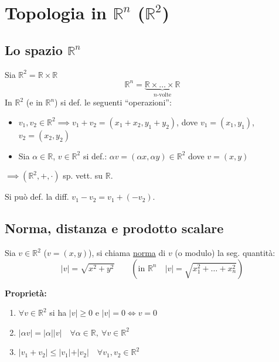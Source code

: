 
\section{Topologia in \texorpdfstring{$\mathbb{R}^n$ ($\mathbb{R}^2$)}{R n (R 2)}}

\subsection{Lo spazio \texorpdfstring{$\mathbb{R}^n$}{R n}}

Sia $\mathbb{R}^2 = \mathbb{R} \times \mathbb{R}$
\[
\mathbb{R}^n = \underbrace{\mathbb{R} \times \dots \times \mathbb{R}}_{n\text{-volte}}
\]
In $\mathbb{R}^2$ (e in $\mathbb{R}^n$) si def. le seguenti ``operazioni'':
\begin{itemize}
    \item[$\oplus$] $v_1, v_2 \in \mathbb{R}^2 \implies v_1 + v_2 = (x_1 + x_2, y_1 + y_2)$, dove $v_1 = (x_1, y_1)$, $v_2 = (x_2, y_2)$
    \item[$\odot$] Sia $\alpha \in \mathbb{R}$, $v \in \mathbb{R}^2$ si def.: $\alpha v = (\alpha x, \alpha y) \in \mathbb{R}^2$ dove $v = (x, y)$
\end{itemize}
$\implies (\mathbb{R}^2, +, \cdot)$ sp. vett. su $\mathbb{R}$.


\begin{oss}
Si può def. la diff. $v_1 - v_2 = v_1 + (-v_2)$.
\end{oss}

\subsection{Norma, distanza e prodotto scalare}

\begin{definition}
Sia $v \in \mathbb{R}^2$ ($v = (x, y)$), si chiama \underline{norma} di $v$ (o modulo) la seg. quantità:
\[
\vert v \vert = \sqrt{x^2 + y^2} \qquad \left(\text{in } \mathbb{R}^n \quad \vert v \vert = \sqrt{x_1^2 + \dots + x_n^2}\right)
\]
\end{definition}

\textbf{Proprietà:}
\begin{enumerate}
    \item $\forall v \in \mathbb{R}^2$ si ha $\vert v \vert \ge 0$ e $\vert v \vert = 0 \iff v = 0$
    \item $\vert \alpha v \vert = \vert \alpha \vert \vert v \vert \quad \forall \alpha \in \mathbb{R}, \ \forall v \in \mathbb{R}^2$
    \item $\vert v_1 + v_2 \vert \le \vert v_1 \vert + \vert v_2 \vert \quad \forall v_1, v_2 \in \mathbb{R}^2$ 
\end{enumerate}

